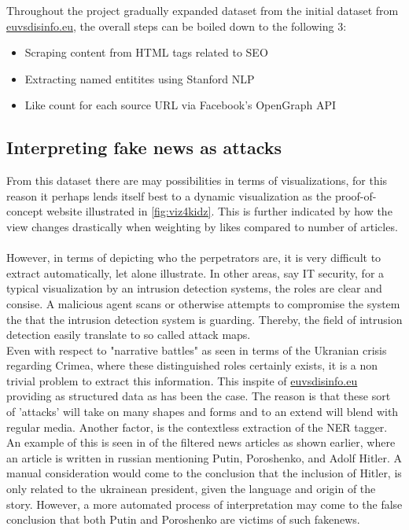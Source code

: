 \documentclass{article}
\begin{document}
Throughout the project gradually expanded dataset from the initial dataset from \href{https://euvsdisinfo}{euvsdisinfo.eu}, the overall steps can be boiled down to the following 3: 
\begin{itemize}
\item Scraping content from HTML tags related to SEO
\item Extracting named entitites using Stanford NLP
\item Like count for each source URL via Facebook's OpenGraph API 
\end{itemize}
\subsection{Interpreting fake news as attacks}
From this dataset there are may possibilities in terms of visualizations, for this reason it perhaps lends itself best to a dynamic visualization as the proof-of-concept website illustrated in \cref{fig:viz4kidz}. This is further indicated by how the view changes drastically when weighting by likes compared to number of articles.
\\\\
However, in terms of depicting who the perpetrators are, it is very difficult to extract automatically, let alone illustrate. In other areas, say IT security, for a typical visualization by an intrusion detection systems, the roles are clear and consise. A malicious agent scans or otherwise attempts to compromise the system the that the intrusion detection system is guarding. Thereby, the field of intrusion detection easily translate to so called attack maps.\\
Even with respect to "narrative battles" as seen in terms of the Ukranian crisis regarding Crimea, where these distinguished roles certainly exists, it is a non trivial problem to extract this information. This inspite of \href{https://euvsdisinfo}{euvsdisinfo.eu} providing as structured data as has been the case. The reason is that these sort of 'attacks' will take on many shapes and forms and to an extend will blend with regular media. Another factor, is the contextless extraction of the NER tagger. An example of this is seen in of the filtered news articles as shown earlier, where an article is written in russian mentioning Putin, Poroshenko, and Adolf Hitler. A manual consideration would come to the conclusion that the inclusion of Hitler, is only related to the ukrainean president, given the language and origin of the story.
However, a more automated process of interpretation may come to the false conclusion that both Putin and Poroshenko are victims of such fakenews.
\end{document}
